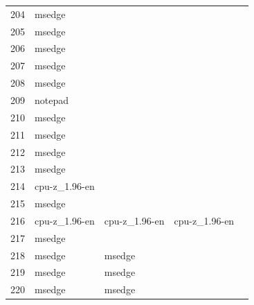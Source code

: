 \documentclass[a4paper,twoside,12pt]{book}
\begin{document}
\begin{appendices}
\begin{table}
\begin{tabular}{lllll}
	204 &         msedge &                &                &                \\
	205 &         msedge &                &                &                \\
	206 &         msedge &                &                &                \\
	207 &         msedge &                &                &                \\
	208 &         msedge &                &                &                \\
	209 &        notepad &                &                &                \\
	210 &         msedge &                &                &                \\
	211 &         msedge &                &                &                \\
	212 &         msedge &                &                &                \\
	213 &         msedge &                &                &                \\
	214 &  cpu-z\_1.96-en &                &                &                \\
	215 &         msedge &                &                &                \\
	216 &  cpu-z\_1.96-en &  cpu-z\_1.96-en &  cpu-z\_1.96-en &                \\
	217 &         msedge &                &                &                \\
	218 &         msedge &         msedge &                &                \\
	219 &         msedge &         msedge &                &                \\
	220 &         msedge &         msedge &                &                \\
	\bottomrule
	\end{tabular}
\end{table}


\end{appendices}
\end{document}

